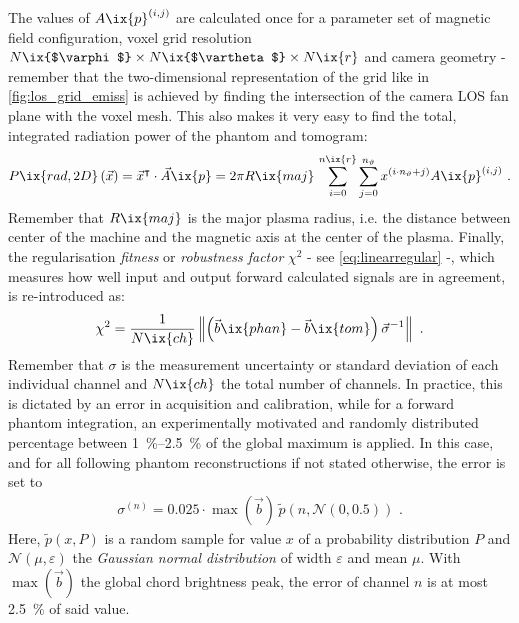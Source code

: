 %
        The values of $A\ix{p}^{\left(i,j\right)}$ are calculated once for a parameter set of magnetic field configuration, voxel grid resolution $N\ix{$\varphi$}\times N\ix{$\vartheta$}\times N\ix{r}$ and camera geometry - remember that the two-dimensional representation of the grid like in \cref{fig:los_grid_emiss} is achieved by finding the intersection of the camera LOS fan plane with the voxel mesh. This also makes it very easy to find the total, integrated radiation power of the phantom and tomogram:
%
        \begin{align}%
            P\ix{rad,2D}\left(\vec{x}\right)=\vec{x}^{\intercal}\cdot\vec{A}\ix{p}=%
            2\pi R\ix{maj}\,\displaystyle\sum_{i=0}^{n\ix{r}}\sum_{j=0}^{n_{\vartheta}}x^{\left(i\cdot n_{\vartheta}+j\right)}A\ix{p}^{\left(i,j\right)}\,\,.%
            \label{eq:prad2D}%
        \end{align}%
%
        Remember that $R\ix{maj}$ is the major plasma radius, i.e. the distance between center of the machine and the magnetic axis at the center of the plasma. Finally, the regularisation \textit{fitness} or \textit{robustness factor} $\chi^{2}$ - see \cref{eq:linearregular} -, which measures how well input and output forward calculated signals are in agreement, is re-introduced as:%
%
        \begin{align}%
            \chi^{2}=\frac{1}{N\ix{ch}}\left\|\left(\vec{b}\ix{phan}-\vec{b}\ix{tom}\right)\vec{\sigma}^{-1}\right\|\,\,.\label{eq:chi2}%
        \end{align}%
%
        Remember that $\sigma$ is the measurement uncertainty or standard deviation of each individual channel and $N\ix{ch}$ the total number of channels. In practice, this is dictated by an error in acquisition and calibration, while for a forward phantom integration, an experimentally motivated and randomly distributed percentage between \SIrange{1}{2.5}{\percent} of the global maximum is applied. In this case, and for all following phantom reconstructions if not stated otherwise, the error is set to%
%
        \begin{align}%
            \sigma^{\left(n\right)}=0.025\cdot\max\left(\vec{b}\right)\,\widetilde{p}\left(n,\mathcal{N}\left(0,0.5\right)\right)\,\,.\nonumber%
        \end{align}%
%
        Here, $\widetilde{p}\left(x,P\right)$ is a random sample for value $x$ of a probability distribution $P$ and $\mathcal{N}\left(\mu,\varepsilon\right)$ the \textit{Gaussian normal distribution} of width $\varepsilon$ and mean $\mu$. With $\max\left(\vec{b}\right)$ the global chord brightness peak, the error of channel $n$ is at most \SI{2.5}{\percent} of said value.\\%
